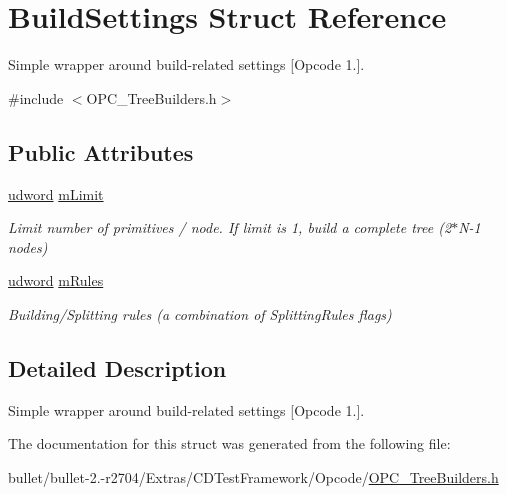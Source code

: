 \hypertarget{struct_build_settings}{\section{Build\+Settings Struct Reference}
\label{struct_build_settings}
}


Simple wrapper around build-\/related settings \mbox{[}Opcode 1.\mbox{]}.  




{\ttfamily \#include $<$O\+P\+C\+\_\+\+Tree\+Builders.\+h$>$}

\subsection*{Public Attributes}
\begin{DoxyCompactItemize}
\item 
\hypertarget{struct_build_settings_adbb3ccc7333ad8b997d1909a5dc8d9a1}{\hyperlink{_ice_types_8h_a44c6f1920ba5551225fb534f9d1a1733}{udword} \hyperlink{struct_build_settings_adbb3ccc7333ad8b997d1909a5dc8d9a1}{m\+Limit}}\label{struct_build_settings_adbb3ccc7333ad8b997d1909a5dc8d9a1}

\begin{DoxyCompactList}\small\item\em Limit number of primitives / node. If limit is 1, build a complete tree (2$\ast$\+N-\/1 nodes) \end{DoxyCompactList}\item 
\hypertarget{struct_build_settings_ad14dde5bf9e78ec536efe5f4d1bb8885}{\hyperlink{_ice_types_8h_a44c6f1920ba5551225fb534f9d1a1733}{udword} \hyperlink{struct_build_settings_ad14dde5bf9e78ec536efe5f4d1bb8885}{m\+Rules}}\label{struct_build_settings_ad14dde5bf9e78ec536efe5f4d1bb8885}

\begin{DoxyCompactList}\small\item\em Building/\+Splitting rules (a combination of Splitting\+Rules flags) \end{DoxyCompactList}\end{DoxyCompactItemize}


\subsection{Detailed Description}
Simple wrapper around build-\/related settings \mbox{[}Opcode 1.\mbox{]}. 

The documentation for this struct was generated from the following file\+:\begin{DoxyCompactItemize}
\item 
bullet/bullet-\/2.-\/r2704/\+Extras/\+C\+D\+Test\+Framework/\+Opcode/\hyperlink{_o_p_c___tree_builders_8h}{O\+P\+C\+\_\+\+Tree\+Builders.\+h}\end{DoxyCompactItemize}
